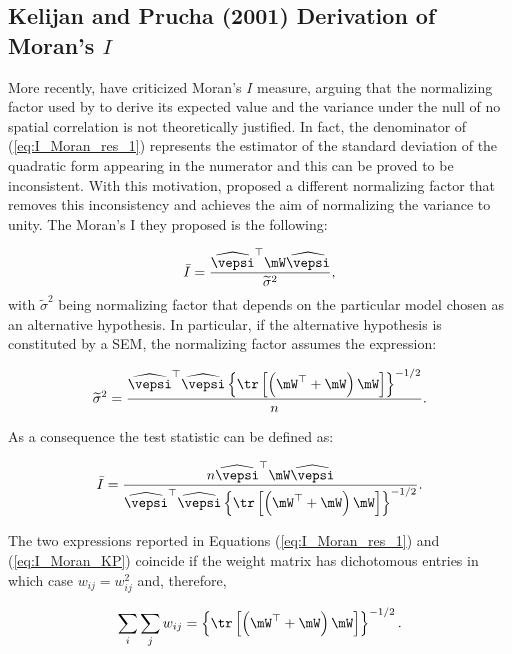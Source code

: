 \documentclass[english,12pt]{book}\usepackage[]{graphicx}\usepackage[]{xcolor}
\begin{document}
\subsection{Kelijan and Prucha (2001) Derivation of Moran's $I$}

More recently, \cite{kelejian2001asymptotic} have criticized Moran's $I$  measure, arguing that the normalizing factor used by \cite{cliff1972testing} to derive its expected value and the variance under the null of no spatial correlation is not theoretically justified. In fact, the denominator of  (\ref{eq:I_Moran_res_1}) represents the estimator of the standard deviation of the quadratic form appearing in the numerator and this can be proved to be inconsistent. With this motivation, \cite{kelejian2001asymptotic} proposed a different normalizing factor that removes this inconsistency and achieves the aim of normalizing the variance to unity. The Moran's I they proposed is the following:

\begin{equation}
  \bar{I} = \frac{\widehat{\vepsi}^\top\mW\widehat{\vepsi}}{\widetilde{\sigma}^2},
\end{equation}
%
with $\widetilde{\sigma}^2$ being normalizing factor that depends on the particular model chosen as an alternative hypothesis. In particular, if the alternative hypothesis is constituted by a SEM, the normalizing factor assumes the expression:

\begin{equation}
  \widetilde{\sigma}^2 = \frac{\widehat{\vepsi}^\top\widehat{\vepsi}\left\lbrace \tr \left[\left(\mW^\top + \mW\right)\mW\right]\right\rbrace^{-1/2}}{n}.
\end{equation}

As a consequence the test statistic can be defined as:

\begin{equation}\label{eq:I_Moran_KP}
  \bar{I}= \frac{n\widehat{\vepsi}^\top\mW\widehat{\vepsi}}{\widehat{\vepsi}^\top\widehat{\vepsi}\left\lbrace \tr \left[\left(\mW^\top + \mW\right)\mW\right]\right\rbrace^{-1/2}}.
\end{equation}

The two expressions reported in Equations (\ref{eq:I_Moran_res_1}) and (\ref{eq:I_Moran_KP}) coincide if the weight matrix has dichotomous entries in which case $w_{ij} = w_{ij}^2$ and, therefore, 

\begin{equation*}
  \sum_i\sum_j w_{ij} = \left\lbrace \tr \left[\left(\mW^\top + \mW\right)\mW\right]\right\rbrace^{-1/2}.
\end{equation*}
\end{document}
